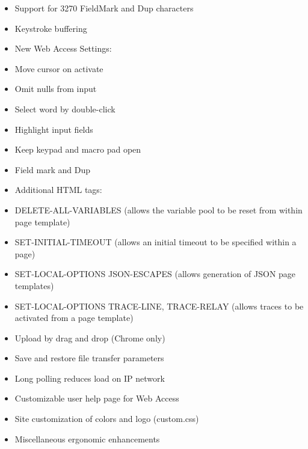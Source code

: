\documentclass[letterpaper,10pt,english]{sphinxmanual}
\begin{document}
\begin{itemize}
\item {} 
Support for 3270 FieldMark and Dup characters

\item {} 
Keystroke buffering

\item {} 
New Web Access Settings:

\item {} 
Move cursor on activate

\item {} 
Omit nulls from input

\item {} 
Select word by double-click

\item {} 
Highlight input fields

\item {} 
Keep keypad and macro pad open

\item {} 
Field mark and Dup

\item {} 
Additional HTML tags:

\item {} 
DELETE-ALL-VARIABLES (allows the variable pool to be reset from within page template)

\item {} 
SET-INITIAL-TIMEOUT (allows an initial timeout to be specified within a page)

\item {} 
SET-LOCAL-OPTIONS JSON-ESCAPES (allows generation of JSON page templates)

\item {} 
SET-LOCAL-OPTIONS TRACE-LINE, TRACE-RELAY (allows traces to be activated from a page template)

\item {} 
Upload by drag and drop (Chrome only)

\item {} 
Save and restore file transfer parameters

\item {} 
Long polling reduces load on IP network

\item {} 
Customizable user help page for Web Access

\item {} 
Site customization of colors and logo (custom.css)

\item {} 
Miscellaneous ergonomic enhancements

\end{itemize}
\end{document}
